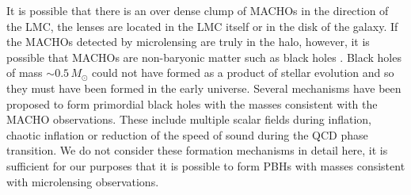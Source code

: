 It is possible that there is an over dense clump of MACHOs in the direction of
the LMC\cite{1996ApJ...473L..99N}, the lenses are located in the LMC
itself\cite{Salati:1999gd} or in the disk of the galaxy\cite{Evans:1997hq}. 
If the MACHOs detected by microlensing are truly in the halo, however, it is
possible that MACHOs are non-baryonic matter such as black holes
\cite{Finn:1996dd,Nakamura:1997sm}. Black holes of mass $\sim 0.5\,M_\odot$
could not have formed as a product of stellar evolution and so they must have
been formed in the early universe\cite{1967SvA....10..602Z,1974MNRAS.168..399C}.
Several mechanisms have been proposed to form primordial black holes with the
masses consistent with the MACHO observations. These include multiple scalar
fields during inflation\cite{Yokoyama:1995ex}, chaotic 
inflation\cite{Yokoyama:1999xi} or reduction of the speed of sound during the
QCD phase transition\cite{Jedamzik:1996mr}. We do not consider these formation
mechanisms in detail here, it is sufficient for our purposes that it is
possible to form PBHs with masses consistent with microlensing observations.

